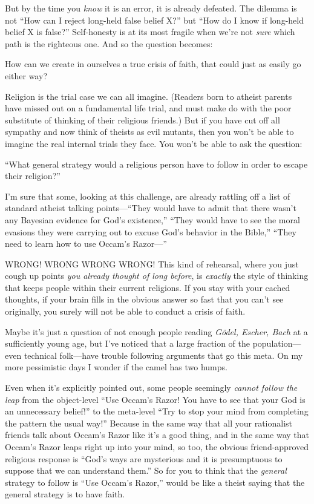 {
 But by the time you \textit{know} it is an error, it is already
defeated. The dilemma is not ``How can I reject
long-held false belief X?'' but
``How do I know if long-held belief X is
false?'' Self-honesty is at its most fragile when
we're not \textit{sure} which path is the righteous
one. And so the question becomes:}

{
 How can we create in ourselves a true crisis of faith, that could
just as easily go either way?}

{
 Religion is the trial case we can all imagine. (Readers born to
atheist parents have missed out on a fundamental life trial, and must
make do with the poor substitute of thinking of their religious
friends.) But if you have cut off all sympathy and now think of theists
as evil mutants, then you won't be able to imagine the
real internal trials they face. You won't be able to
ask the question:}

{
 ``What general strategy would a religious person
have to follow in order to escape their religion?''}

{
 I'm sure that some, looking at this challenge, are
already rattling off a list of standard atheist talking
points---``They would have to admit that there
wasn't any Bayesian evidence for God's
existence,'' ``They would have to
see the moral evasions they were carrying out to excuse
God's behavior in the Bible,''
``They need to learn how to use
Occam's Razor---''}

{
 WRONG! WRONG WRONG WRONG! This kind of rehearsal, where you just
cough up points \textit{you already thought of long before}, is
\textit{exactly} the style of thinking that keeps people within their
current religions. If you stay with your cached thoughts, if your brain
fills in the obvious answer so fast that you can't see
originally, you surely will not be able to conduct a crisis of faith.}

{
 Maybe it's just a question of not enough people
reading \textit{Gödel, Escher, Bach} at a sufficiently young age, but
I've noticed that a large fraction of the
population---even technical folk---have trouble following arguments
that go this meta. On my more pessimistic days I wonder if the camel
has two humps.}

{
 Even when it's explicitly pointed out, some people
seemingly \textit{cannot follow the leap} from the object-level
``Use Occam's Razor! You have to see
that your God is an unnecessary belief!'' to the
meta-level ``Try to stop your mind from completing the
pattern the usual way!'' Because in the same way that
all your rationalist friends talk about Occam's Razor
like it's a good thing, and in the same way that
Occam's Razor leaps right up into your mind, so too,
the obvious friend-approved religious response is
``God's ways are mysterious and it is
presumptuous to suppose that we can understand
them.'' So for you to think that the \textit{general}
strategy to follow is ``Use Occam's
Razor,'' would be like a theist saying that the
general strategy is to have faith.}

